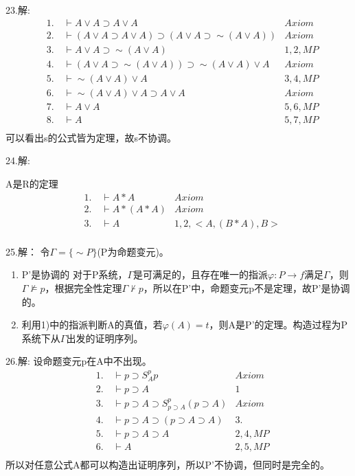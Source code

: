 \documentclass[a4paper]{ctexart}
\begin{document}
\noindent 23.解:
\begin{align*}
  &1.\quad \vdash A\vee A\supset A\vee A &Axiom \\
  &2.\quad \vdash (A\vee A\supset A\vee A) \supset \left(A\vee A\supset \sim(A\vee A)\right) &Axiom \\
  &3.\quad \vdash A\vee A\supset \sim(A\vee A) &1,2,MP \\
  &4.\quad \vdash \left(A\vee A\supset \sim(A\vee A)\right)\supset \sim(A\vee A)\vee A &Axiom \\
  &5.\quad \vdash \sim(A\vee A)\vee A &3,4,MP \\
  &6.\quad \vdash \sim(A\vee A)\vee A\supset A\vee A &Axiom \\
  &7.\quad \vdash A\vee A &5,6,MP \\
  &8.\quad \vdash A &5,7,MP \\
\end{align*}
可以看出s的公式皆为定理，故s不协调。\newline

\noindent 24.解:

A是R的定理
\begin{align*}
  &1.\quad \vdash A*A &Axiom \\
  &2.\quad \vdash A*(A*A) &Axiom \\
  &3.\quad \vdash A &1,2,<A,(B*A),B> \\
\end{align*}

\noindent 25.解：
令$\Gamma=\{\sim P\}$(P为命题变元)。
\begin{enumerate}
  \item P'是协调的
  对于P系统，$\Gamma$是可满足的，且存在唯一的指派$\varphi:{P}\rightarrow f$满足$\Gamma$，则$\Gamma\not\models p$，根据完全性定理$\Gamma\not\vdash p$，所以在P'中，命题变元p不是定理，故P'是协调的。
  \item 利用1)中的指派判断A的真值，若$\varphi(A)=t$，则A是P'的定理。构造过程为P系统下从$\Gamma$出发的证明序列。
\end{enumerate}

\noindent 26.解:
设命题变元p在A中不出现。
\begin{align*}
  &1.\quad \vdash p\supset S_{A}^p p  &Axiom \\
  &2.\quad \vdash p\supset A &1 \\
  &3.\quad \vdash p\supset A\supset S_{p\supset A}^p(p\supset A) &Axiom \\
  &4.\quad \vdash p\supset A\supset(p\supset A\supset A) &3. \\
  &5.\quad \vdash p\supset A\supset A &2,4,MP \\
  &6.\quad \vdash A &2,5,MP \\
\end{align*}
所以对任意公式A都可以构造出证明序列，所以P'不协调，但同时是完全的。\newline
\end{document}
